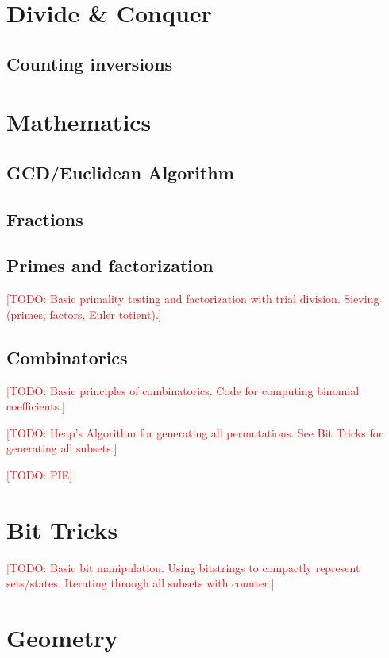 \documentclass[10pt]{book}
\newcommand{\todo}[1]{\textcolor{red}{[TODO: #1]}}
\begin{document}
\chapter{Divide \& Conquer}

\section{Counting inversions}

\chapter{Mathematics}

\section{GCD/Euclidean Algorithm}

\section{Fractions}

\section{Primes and factorization}

\todo{Basic primality testing and factorization with trial division.
  Sieving (primes, factors, Euler totient).}

\section{Combinatorics}

\todo{Basic principles of combinatorics.  Code for computing binomial
  coefficients.}

\todo{Heap's Algorithm for generating all permutations.  See Bit
  Tricks for generating all subsets.}

\todo{PIE}

\chapter{Bit Tricks}

\todo{Basic bit manipulation.  Using bitstrings to compactly represent
  sets/states.  Iterating through all subsets with counter.}

\chapter{Geometry}
\end{document}
